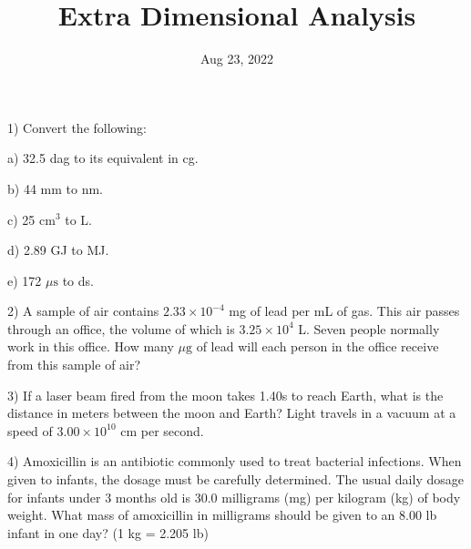 \documentclass[12pt]{article}
\title{\textbf{Extra Dimensional Analysis}}
\date{Aug 23, 2022}
\begin{document}
\maketitle 

1) Convert the following:

a) 32.5 dag to its equivalent in cg.

b) 44 mm to nm.

c) 25 cm$^3$ to L.

d) 2.89 GJ to MJ.

e) 172 $\mu\text{s}$ to ds.

2) A sample of air contains $2.33 \times 10^{-4}$ mg of lead per mL of gas.
This air passes through an office, the volume of which is $3.25 \times 10^4$ L.
Seven people normally work in this office. How many $\mu\text{g}$ of lead will each
person in the office receive from this sample of air?

3) If a laser beam fired from the moon takes 1.40s to reach Earth, what is the
distance in meters between the moon and Earth? Light travels in a vacuum
at a speed of $3.00 \times 10^{10}$ cm per second.

4) Amoxicillin is an antibiotic commonly used to treat bacterial infections.
When given to infants, the dosage must be carefully determined. The usual
daily dosage for infants under 3 months old is 30.0 milligrams (mg) per kilogram
(kg) of body weight. What mass of amoxicillin in milligrams should be given to
an 8.00 lb infant in one day? (1 kg = 2.205 lb)
\end{document}
